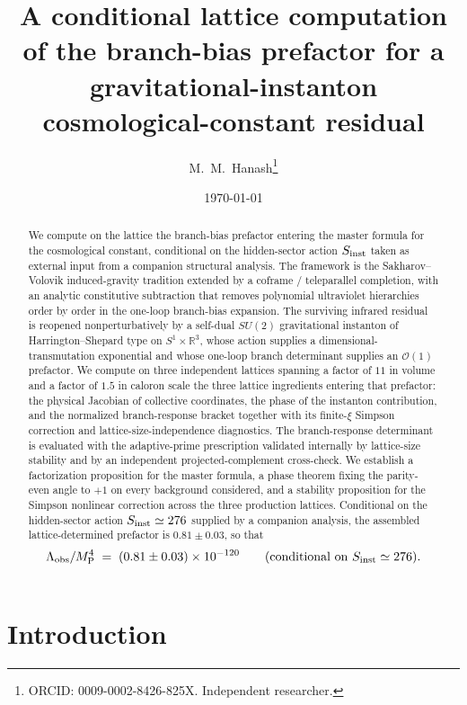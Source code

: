 \documentclass[a4paper,11pt]{article}
\title{A conditional lattice computation of the branch-bias prefactor for a gravitational-instanton cosmological-constant residual}
\author{M.~M.~Hanash\thanks{ORCID: 0009-0002-8426-825X. Independent researcher.}}
\date{\today}
\theoremstyle{definition}
\newcommand{\MP}{M_{\rm P}}
\newcommand{\Lobs}{\Lambda_{\rm obs}}
\newcommand{\bR}{\mathbb{R}}
\begin{document}
\maketitle

\begin{abstract}
We compute on the lattice the branch-bias prefactor entering the
master formula for the cosmological constant, conditional on the
hidden-sector action $S_{\rm inst}$ taken as external input from a
companion structural analysis. The framework is the
Sakharov--Volovik induced-gravity tradition extended by a coframe /
teleparallel completion, with an analytic constitutive subtraction
that removes polynomial ultraviolet hierarchies order by order in
the one-loop branch-bias expansion. The surviving infrared residual
is reopened nonperturbatively by a self-dual $SU(2)$ gravitational
instanton of Harrington--Shepard type on $S^1 \times \bR^3$,
whose action supplies a dimensional-transmutation exponential and
whose one-loop branch determinant supplies an $\mathcal{O}(1)$
prefactor. We compute on three independent lattices spanning a
factor of $11$ in volume and a factor of $1.5$ in caloron scale
the three lattice ingredients entering that prefactor: the
physical Jacobian of collective coordinates, the phase of the
instanton contribution, and the normalized branch-response
bracket together with its finite-$\xi$ Simpson correction and
lattice-size-independence diagnostics. The branch-response determinant is
evaluated with the adaptive-prime prescription validated
internally by lattice-size stability and by an independent
projected-complement cross-check. We establish a factorization
proposition for the master formula, a phase theorem fixing the
parity-even angle to $+1$ on every background considered, and a
stability proposition for the Simpson nonlinear correction across
the three production lattices. Conditional on the hidden-sector action $S_{\rm inst} \simeq 276$
supplied by a companion analysis, the assembled
lattice-determined prefactor is $0.81 \pm 0.03$, so that
\[
\Lobs/\MP^4 \;=\; (0.81 \pm 0.03) \times 10^{-120}
\qquad
\text{(conditional on $S_{\rm inst} \simeq 276$)}.
\]
\end{abstract}

\section{Introduction}
\label{sec:introduction}
\end{document}
